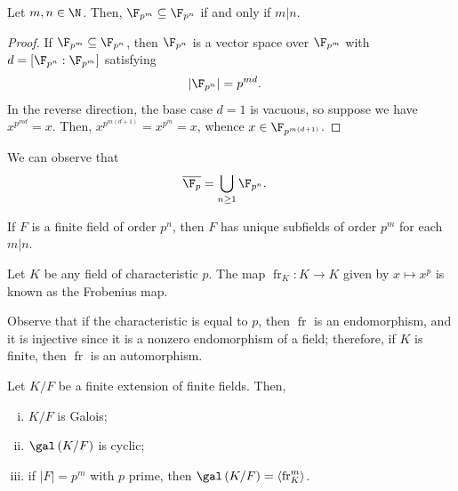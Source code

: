\documentclass[10pt]{mypackage}
\begin{document}
\begin{proposition}
  Let $m,n\in \N$. Then, $\F_{p^{m}}\subseteq \F_{p^{n}}$ if and only if $m | n$.
\end{proposition}
\begin{proof}
  If $\F_{p^{m}}\subseteq \F_{p^{n}}$, then $\F_{p^{n}}$ is a vector space over $\F_{p^{m}}$ with $d = \left[ \F_{p^{n}}:\F_{p^{m}} \right]$ satisfying
  \begin{align*}
    \left\vert \F_{p^n} \right\vert &= p^{md}.
  \end{align*}
  In the reverse direction, the base case $d = 1$ is vacuous, so suppose we have $x^{p^{md}} = x$. Then, $x^{p^{m(d+1)}} = x^{p^{m}} = x$, whence $x\in \F_{p^{m\left( d+1 \right)}}$.
\end{proof}
\begin{remark}
  We can observe that
  \begin{align*}
    \overline{\F_p} &= \bigcup_{n\geq 1} \F_{p^{n}}.
  \end{align*}
\end{remark}
\begin{corollary}
  If $F$ is a finite field of order $p^{n}$, then $F$ has unique subfields of order $p^{m}$ for each $m | n$.
\end{corollary}
\begin{definition}
  Let $K$ be any field of characteristic $p$. The map $\operatorname{fr}_K\colon K\rightarrow K$ given by $x\mapsto x^{p}$ is known as the Frobenius map.
\end{definition}
Observe that if the characteristic is equal to $p$, then $\operatorname{fr}$ is an endomorphism, and it is injective since it is a nonzero endomorphism of a field; therefore, if $K$ is finite, then $\operatorname{fr}$ is an automorphism.
\begin{theorem}
  Let $K/F$ be a finite extension of finite fields. Then,
  \begin{enumerate}[(i)]
    \item $K/F$ is Galois;
    \item $\gal\left( K/F \right)$ is cyclic;
    \item if $\left\vert F \right\vert = p^{m}$ with $p$ prime, then $\gal\left( K/F \right) = \left\langle \operatorname{fr}_{K}^{m} \right\rangle$.
  \end{enumerate}
\end{theorem}
\end{document}
